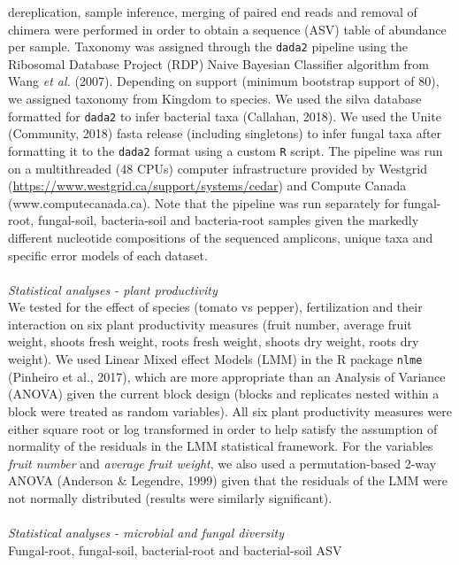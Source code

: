 \documentclass[11pt,]{article}
\begin{document}
dereplication, sample inference, merging of paired end reads and removal
of chimera were performed in order to obtain a sequence (ASV) table of
abundance per sample. Taxonomy was assigned through the \texttt{dada2}
pipeline using the Ribosomal Database Project (RDP) Naive Bayesian
Classifier algorithm from Wang \emph{et al.} (2007). Depending on
support (minimum bootstrap support of 80), we assigned taxonomy from
Kingdom to species. We used the silva database formatted for
\texttt{dada2} to infer bacterial taxa (Callahan, 2018). We used the
Unite (Community, 2018) fasta release (including singletons) to infer
fungal taxa after formatting it to the \texttt{dada2} format using a
custom \texttt{R} script. The pipeline was run on a multithreaded (48
CPUs) computer infrastructure provided by Westgrid
(\url{https://www.westgrid.ca/support/systems/cedar}) and Compute Canada
(www.computecanada.ca). Note that the pipeline was run separately for
fungal-root, fungal-soil, bacteria-soil and bacteria-root samples given
the markedly different nucleotide compositions of the sequenced
amplicons, unique taxa and specific error models of each dataset. ~\\
\hspace*{0.333em}\\
\emph{Statistical analyses - plant productivity}\\
We tested for the effect of species (tomato vs pepper), fertilization
and their interaction on six plant productivity measures (fruit number,
average fruit weight, shoots fresh weight, roots fresh weight, shoots
dry weight, roots dry weight). We used Linear Mixed effect Models (LMM)
in the R package \texttt{nlme} (Pinheiro et al., 2017), which are more
appropriate than an Analysis of Variance (ANOVA) given the current block
design (blocks and replicates nested within a block were treated as
random variables). All six plant productivity measures were either
square root or log transformed in order to help satisfy the assumption
of normality of the residuals in the LMM statistical framework. For the
variables \emph{fruit number} and \emph{average fruit weight}, we also
used a permutation-based 2-way ANOVA (Anderson \& Legendre, 1999) given
that the residuals of the LMM were not normally distributed (results
were similarly significant).\\
\hspace*{0.333em}\\
\emph{Statistical analyses - microbial and fungal diversity}\\
Fungal-root, fungal-soil, bacterial-root and bacterial-soil ASV
\end{document}
